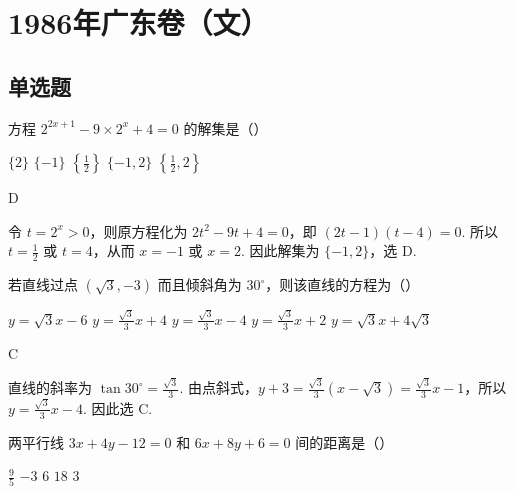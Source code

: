 \documentclass[UTF8,a4paper,oneside,11pt]{ctexbook}
\begin{document}
\mainmatter

\chapter{1986年广东卷（文）}

\section{单选题}

\begin{problem}

方程 \(2^{2x+1}-9\times2^{x}+4=0 \) 的解集是（\quad）

\choicesfive
    {\(\{2\}\)}
    {\(\{-1\} \)}
    {\(\left\{\frac{1}{2}\right\} \)}
    {\(\{-1, 2\} \)}
    {\(\left\{\frac{1}{2}, 2\right\} \)}
\end{problem}

\begin{answer}
D
\end{answer}

\begin{solution}
令 \(t=2^x>0\)，则原方程化为 \(2t^2-9t+4=0\)，即 \((2t-1)(t-4)=0\). 所以 \(t=\frac{1}{2}\) 或 \(t=4\)，从而 \(x=-1\) 或 \(x=2\). 因此解集为 \(\{-1,2\}\)，选 D.
\end{solution}



\begin{problem}

若直线过点 \(\left(\sqrt{3}, -3\right)\) 而且倾斜角为 \(30^{\circ}\)，则该直线的方程为（\quad）

\choicesfive
    {\(y = \sqrt{3} x - 6 \)}
    {\(y = \frac{\sqrt{3}}{3} x + 4 \)}
    {\(y = \frac{\sqrt{3}}{3} x - 4 \)}
    {\(y = \frac{\sqrt{3}}{3} x + 2\)}
    {\(y = \sqrt{3} x + 4\sqrt{3} \)}
\end{problem}

\begin{answer}
C
\end{answer}

\begin{solution}
直线的斜率为 \(\tan30^{\circ}=\frac{\sqrt{3}}{3}\). 由点斜式，\(y+3=\frac{\sqrt{3}}{3}(x-\sqrt{3})=\frac{\sqrt{3}}{3}x-1\)，所以 \(y=\frac{\sqrt{3}}{3}x-4\). 因此选 C.
\end{solution}



\begin{problem}

两平行线 \(3x + 4y - 12 = 0\) 和 \(6x + 8y + 6 = 0\) 间的距离是（\quad）

\choicesfive
    {\(\frac{9}{5}\)}
    {\(-3\)}
    {\(6\)}
    {\(18\)}
    {\(3\)}
\end{problem}
\end{document}

